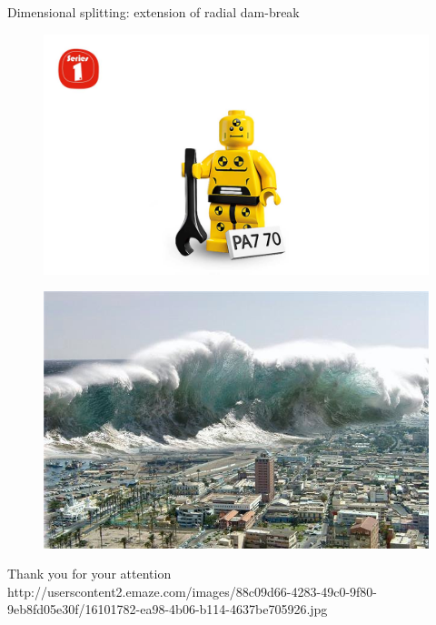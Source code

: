 \documentclass[shortpres]{beamer}
\newcommand{\imgfullscale}{0.75}
\begin{document}
\begin{frame}{Dimensional splitting: extension of radial dam-break}
	\begin{figure}
		\includegraphics[clip, width=\imgfullscale\linewidth]{img/dummy_image.jpg}
	\end{figure}
	
\end{frame}

\begin{frame}{}
	\begin{figure}
		\includegraphics[clip, width=\imgfullscale\linewidth]{img/tsunami.jpg}
	\end{figure}
	\centering
	Thank you for your attention
	\\
	\vfill
	\flushleft
	{\fontsize{5}{5} \selectfont http://userscontent2.emaze.com/images/88c09d66-4283-49c0-9f80-9eb8fd05e30f/16101782-ea98-4b06-b114-4637be705926.jpg}
\end{frame}
\end{document}
